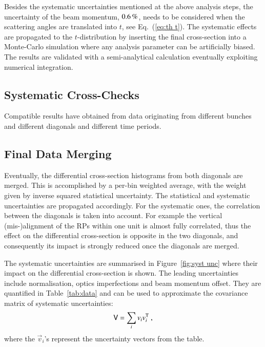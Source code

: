 Besides the systematic uncertainties mentioned at the above analysis steps, the uncertainty of the beam momentum, $0.6\,{\rm \%}$, needs to be considered when the scattering angles are translated into $t$, see Eq.~(\ref{eq:th t}). The systematic effects are propagated to the $t$-distribution by inserting the final cross-section into a Monte-Carlo simulation where any analysis parameter can be artificially biased. The results are validated with a semi-analytical calculation eventually exploiting numerical integration.




\subsection{Systematic Cross-Checks}
\label{sec:cross checks}

Compatible results have obtained from data originating from different bunches and different diagonals and different time periods.


\subsection{Final Data Merging}
\label{sec:final data merging}

Eventually, the differential cross-section histograms from both diagonals are merged. This is accomplished by a per-bin weighted average, with the weight given by inverse squared statistical uncertainty. The statistical and systematic uncertainties are propagated accordingly. For the systematic ones, the correlation between the diagonals is taken into account. For example the vertical (mis-)alignment of the RPs within one unit is almost fully correlated, thus the effect on the differential cross-section is opposite in the two diagonals, and consequently its impact is strongly reduced once the diagonals are merged.

The systematic uncertainties are summarised in Figure~\ref{fig:syst unc} where their impact on the differential cross-section is shown. The leading uncertainties include normalisation, optics imperfections and beam momentum offset. They are quantified in Table~\ref{tab:data} and can be used to approximate the covariance matrix of systematic uncertainties:
\begin{equation}
\label{eq:covar mat}
\mathsf{V} = \sum_{i} v_i v_i^{\rm T}\ ,
\end{equation}
where the $\vec v_i$'s represent the uncertainty vectors from the table.

